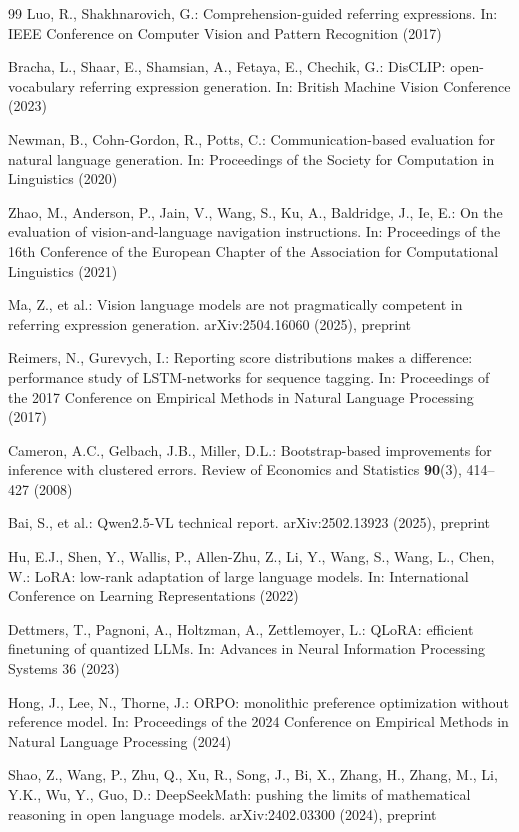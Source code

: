 \documentclass[runningheads,a4paper]{llncs}
\begin{document}
\begin{thebibliography}{99}
Luo, R., Shakhnarovich, G.: Comprehension-guided referring expressions. In: IEEE Conference on
Computer Vision and Pattern Recognition (2017)

Bracha, L., Shaar, E., Shamsian, A., Fetaya, E., Chechik, G.: DisCLIP: open-vocabulary referring expression generation.
In: British Machine Vision Conference (2023)

Newman, B., Cohn-Gordon, R., Potts, C.: Communication-based evaluation for natural language
generation. In: Proceedings of the Society for Computation in Linguistics (2020)

Zhao, M., Anderson, P., Jain, V., Wang, S., Ku, A., Baldridge, J., Ie, E.: On the evaluation of
vision-and-language navigation instructions. In: Proceedings of the 16th Conference of the
European Chapter of the Association for Computational Linguistics (2021)

Ma, Z., et al.: Vision language models are not pragmatically competent in referring expression
generation. arXiv:2504.16060 (2025), preprint

Reimers, N., Gurevych, I.: Reporting score distributions makes a difference: performance study of
LSTM-networks for sequence tagging. In: Proceedings of the 2017 Conference on Empirical Methods
in Natural Language Processing (2017)

Cameron, A.C., Gelbach, J.B., Miller, D.L.: Bootstrap-based improvements for inference with
clustered errors. Review of Economics and Statistics \textbf{90}(3), 414--427 (2008)

Bai, S., et al.: Qwen2.5-VL technical report. arXiv:2502.13923 (2025), preprint

Hu, E.J., Shen, Y., Wallis, P., Allen-Zhu, Z., Li, Y., Wang, S., Wang, L., Chen, W.: LoRA:
low-rank adaptation of large language models. In: International Conference on Learning
Representations (2022)

Dettmers, T., Pagnoni, A., Holtzman, A., Zettlemoyer, L.: QLoRA: efficient finetuning of
quantized LLMs. In: Advances in Neural Information Processing Systems 36 (2023)

Hong, J., Lee, N., Thorne, J.: ORPO: monolithic preference optimization without reference model.
In: Proceedings of the 2024 Conference on Empirical Methods in Natural Language Processing (2024)

Shao, Z., Wang, P., Zhu, Q., Xu, R., Song, J., Bi, X., Zhang, H., Zhang, M., Li, Y.K., Wu, Y.,
Guo, D.: DeepSeekMath: pushing the limits of mathematical reasoning in open language models.
arXiv:2402.03300 (2024), preprint


\end{thebibliography}
\end{document}
